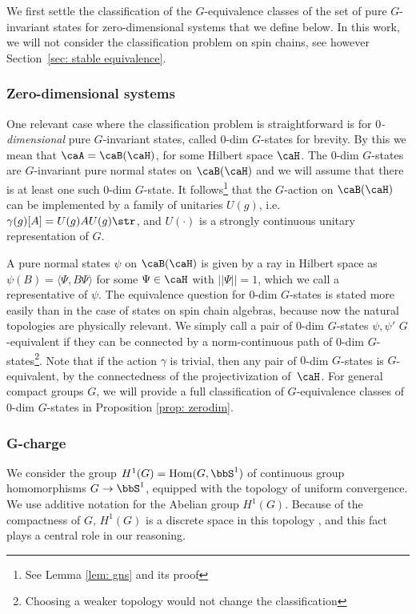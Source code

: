We first settle the classification of the $G$-equivalence classes of the set of pure $G$-invariant states for zero-dimensional systems that we define below. In this work, we will not consider the classification problem on spin chains, see however Section~\ref{sec: stable equivalence}.

\subsubsection{Zero-dimensional systems}\label{sec: equivalence zero}
One relevant case where the classification problem is straightforward is for \emph{$0$-dimensional} pure $G$-invariant states, called $0$-dim $G$-states for brevity. 
By this we mean that $\caA = \caB(\caH)$, for some Hilbert space $\caH$. The $0$-dim $G$-states are $G$-invariant pure normal states on $\caB(\caH)$ and we will assume that there is at least one such $0$-dim $G$-state. 
It follows\footnote{See Lemma \ref{lem: gns} and its proof} that the $G$-action on $\caB(\caH)$ can be implemented by a family of unitaries $U(g)$, i.e.\  $ \gamma(g)[A] = U(g) A U(g)\str$, and $U(\cdot)$ is a strongly continuous unitary representation of $G$.

A pure normal states $\psi$ on $\caB(\caH)$ is given by a ray in Hilbert space as  $\psi(B)=\langle\Psi, B\Psi\rangle$ for some $\Psi \in \caH$ with $||\Psi||=1$, which we call a representative of $\psi$.
The equivalence question for $0$-dim $G$-states is stated more easily than in the case of states on spin chain algebras, because now the natural topologies are physically relevant. 
We simply call a pair of $0$-dim $G$-states $\psi,\psi'$  $G$-equivalent if they can be connected by a norm-continuous path of $0$-dim $G$-states\footnote{Choosing a weaker topology would not change the classification}.  
Note that if the action $\gamma$ is trivial, then any pair of $0$-dim $G$-states is $G$-equivalent, by the connectedness of the projectivization of~$\caH$. For general compact groups $G$, we will provide a full classification of $G$-equivalence classes of $0$-dim $G$-states  in Proposition \ref{prop: zerodim}.

\subsubsection{G-charge}\label{sec: g charge}

We consider the group $H^1(G)=\mathrm{Hom}(G,\bbS^1)$ of continuous group homomorphisms $G\to \bbS^1$, equipped with the topology of uniform convergence. We use additive notation for the Abelian group $H^1(G)$. Because of the compactness of $G$,  $H^1(G)$ is a discrete space in this topology \cite{hofmann1965topologische}, and this fact plays a central role in our reasoning. 


